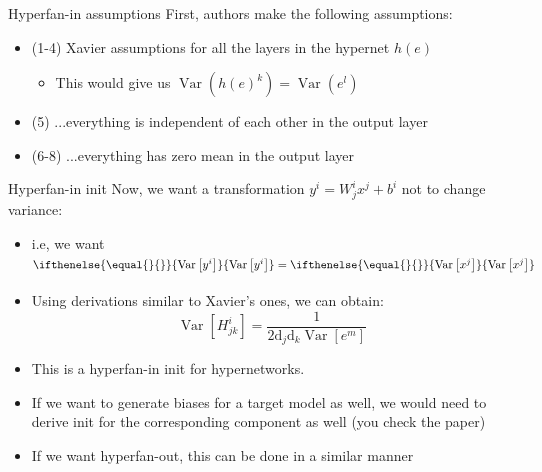 \documentclass[handout, 10pt]{beamer}
\newcommand{\var}[2][]{
\ifthenelse{\equal{#1}{}}{
\text{Var}\left[#2\right]
}{
\underset{#1}{\text{Var}}\left[#2\right]
}}
\begin{document}
\begin{frame}{Hyperfan-in assumptions}
    \pause First, authors make the following assumptions:
    \begin{itemize}
        \item\pause (1-4) Xavier assumptions for all the layers in the hypernet $h(e)$
        \begin{itemize}
            \item\pause This would give us $\operatorname{Var}\left(h(e)^{k}\right)=\operatorname{Var}\left(e^{l}\right)$
        \end{itemize}
        \item\pause (5) ...everything is independent of each other in the output layer
        \item\pause (6-8) ...everything has zero mean in the output layer
    \end{itemize}
\end{frame}

\begin{frame}{Hyperfan-in init}
    \pause
    Now, we want a transformation $y^i = W_j^i x^j + b^i$ not to change variance:
    \begin{itemize}
        \item\pause i.e, we want $\var{y^i} = \var{x^j}$
        \item\pause Using derivations similar to Xavier's ones, we can obtain:
\begin{equation}
\operatorname{Var}\left[H_{j k}^{i}\right]=\frac{1}{2 \mathrm{d}_{j} \mathrm{d}_{k} \operatorname{Var}\left[e^{m}\right]}
\end{equation}
        \item\pause This is a hyperfan-in init for hypernetworks.
        \item\pause If we want to generate biases for a target model as well, we would need to derive init for the corresponding component as well (you check the paper)
        \item\pause If we want hyperfan-out, this can be done in a similar manner
    \end{itemize}
\end{frame}
\end{document}
